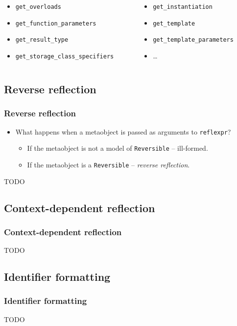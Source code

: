 \documentclass[compress,table,xcolor=table]{beamer}
\begin{document}
\begin{frame}
\begin{columns}
    \scriptsize
    \begin{column}{0.45\textwidth}
      \begin{itemize}
      \item \texttt{get\_overloads}
      \item \texttt{get\_function\_parameters}
      \item \texttt{get\_result\_type}
      \item \texttt{get\_storage\_class\_specifiers}
      \end{itemize}
    \end{column}
    \begin{column}{0.40\textwidth}
      \begin{itemize}
      \item \texttt{get\_instantiation}
      \item \texttt{get\_template}
      \item \texttt{get\_template\_parameters}
      \item \ldots
      \end{itemize}
    \end{column}
  \end{columns}
\end{frame}

\subsection{Reverse reflection}
\begin{frame}
\frametitle{Reverse reflection}
  \begin{itemize}
    \item What happens when a metaobject is passed as arguments
      to \texttt{reflexpr}?
    \begin{itemize}
    \item If the metaobject is not a model of \texttt{Reversible} -- ill-formed.
    \item If the metaobject is a \texttt{Reversible} -- {\em reverse reflection}.
    \end{itemize}
  \end{itemize}
\Huge TODO
\end{frame}

\subsection{Context-dependent reflection}
\begin{frame}
\frametitle{Context-dependent reflection}
\Huge TODO
\end{frame}

\subsection{Identifier formatting}
\begin{frame}
\frametitle{Identifier formatting}
\Huge TODO
\end{frame}
\end{document}
